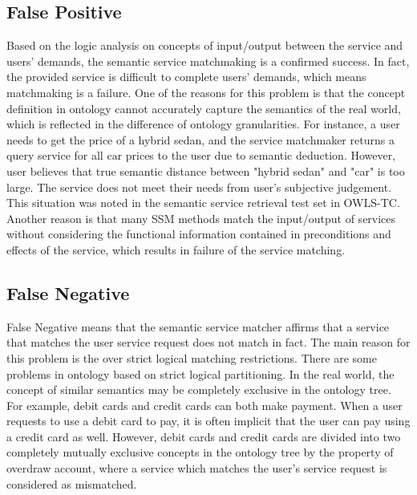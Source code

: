 \documentclass{ieeeaccess}
\begin{document}
\subsection{False Positive}
Based on the logic analysis on concepts of input/output between the service and users' demands, the semantic service matchmaking is a confirmed success. In fact, the provided service is difficult to complete users' demands, which means matchmaking is a failure. One of the reasons for this problem is that the concept definition in ontology cannot accurately capture the semantics of the real world, which is reflected in the difference of ontology granularities. For instance, a user needs to get the price of a hybrid sedan, and the service matchmaker returns a query service for all car prices to the user due to semantic deduction. However, user believes that true semantic distance between "hybrid sedan" and "car" is too large. The service does not meet their needs from user's subjective judgement. This situation was noted in the semantic service retrieval test set in OWLS-TC. Another reason is that many SSM methods match the input/output of services without considering the functional information contained in preconditions and effects of the service, which results in failure of the service matching.

\subsection{False Negative}
False Negative means that the semantic service matcher affirms that a service that matches the user service request does not match in fact. The main reason for this problem is the over strict logical matching restrictions. There are some problems in ontology based on strict logical partitioning. In the real world, the concept of similar semantics may be completely exclusive in the ontology tree. For example, debit cards and credit cards can both make payment. When a user requests to use a debit card to pay, it is often implicit that the user can pay using a credit card as well. However, debit cards and credit cards are divided into two completely mutually exclusive concepts in the ontology tree by the property of overdraw account, where a service which matches the user's service request is considered as mismatched.
\end{document}
